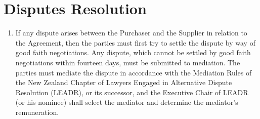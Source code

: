 \documentclass[nz-terms]{subfiles}
\begin{document}
\section{Disputes Resolution}

\begin{enumerate}
\item If any dispute arises between the Purchaser and the Supplier in relation
to the Agreement, then the parties must first try to settle the dispute by
way of good faith negotiations. Any dispute, which cannot be settled by good
faith negotiations within fourteen days, must be submitted to mediation. The
parties must mediate the dispute in accordance with the Mediation Rules of
the New Zealand Chapter of Lawyers Engaged in Alternative Dispute Resolution
(LEADR), or its successor, and the Executive Chair of LEADR (or his nominee)
shall select the mediator and determine the mediator's remuneration.
\end{enumerate}
\end{document}
